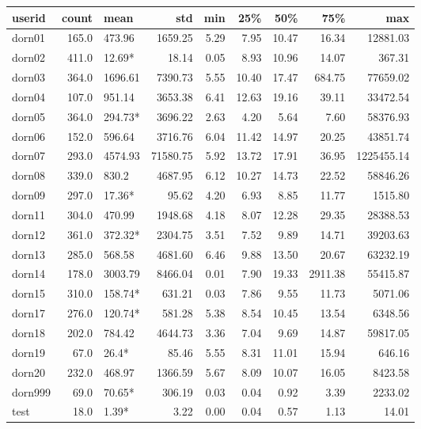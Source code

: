 \begin{tabular}{lrlrrrrrr}
\toprule
  userid &  count &     mean &       std &   min &    25\% &    50\% &      75\% &         max \\
\midrule
  dorn01 &  165.0 &   473.96 &   1659.25 &  5.29 &   7.95 &  10.47 &    16.34 &    12881.03 \\
  dorn02 &  411.0 &   12.69* &     18.14 &  0.05 &   8.93 &  10.96 &    14.07 &      367.31 \\
  dorn03 &  364.0 &  1696.61 &   7390.73 &  5.55 &  10.40 &  17.47 &   684.75 &    77659.02 \\
  dorn04 &  107.0 &   951.14 &   3653.38 &  6.41 &  12.63 &  19.16 &    39.11 &    33472.54 \\
  dorn05 &  364.0 &  294.73* &   3696.22 &  2.63 &   4.20 &   5.64 &     7.60 &    58376.93 \\
  dorn06 &  152.0 &   596.64 &   3716.76 &  6.04 &  11.42 &  14.97 &    20.25 &    43851.74 \\
  dorn07 &  293.0 &  4574.93 &  71580.75 &  5.92 &  13.72 &  17.91 &    36.95 &  1225455.14 \\
  dorn08 &  339.0 &    830.2 &   4687.95 &  6.12 &  10.27 &  14.73 &    22.52 &    58846.26 \\
  dorn09 &  297.0 &   17.36* &     95.62 &  4.20 &   6.93 &   8.85 &    11.77 &     1515.80 \\
  dorn11 &  304.0 &   470.99 &   1948.68 &  4.18 &   8.07 &  12.28 &    29.35 &    28388.53 \\
  dorn12 &  361.0 &  372.32* &   2304.75 &  3.51 &   7.52 &   9.89 &    14.71 &    39203.63 \\
  dorn13 &  285.0 &   568.58 &   4681.60 &  6.46 &   9.88 &  13.50 &    20.67 &    63232.19 \\
  dorn14 &  178.0 &  3003.79 &   8466.04 &  0.01 &   7.90 &  19.33 &  2911.38 &    55415.87 \\
  dorn15 &  310.0 &  158.74* &    631.21 &  0.03 &   7.86 &   9.55 &    11.73 &     5071.06 \\
  dorn17 &  276.0 &  120.74* &    581.28 &  5.38 &   8.54 &  10.45 &    13.54 &     6348.56 \\
  dorn18 &  202.0 &   784.42 &   4644.73 &  3.36 &   7.04 &   9.69 &    14.87 &    59817.05 \\
  dorn19 &   67.0 &    26.4* &     85.46 &  5.55 &   8.31 &  11.01 &    15.94 &      646.16 \\
  dorn20 &  232.0 &   468.97 &   1366.59 &  5.67 &   8.09 &  10.07 &    16.05 &     8423.58 \\
 dorn999 &   69.0 &   70.65* &    306.19 &  0.03 &   0.04 &   0.92 &     3.39 &     2233.02 \\
    test &   18.0 &    1.39* &      3.22 &  0.00 &   0.04 &   0.57 &     1.13 &       14.01 \\
\bottomrule
\end{tabular}
